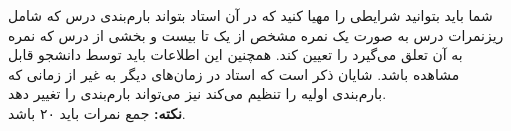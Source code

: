 

شما باید بتوانید شرایطی را مهیا کنید که در آن استاد بتواند بارم‌بندی درس که شامل ریزنمرات درس به صورت یک نمره مشخص از یک تا بیست و بخشی از درس که نمره به آن تعلق می‌گیرد را تعیین کند.
همچنین این اطلاعات باید توسط دانشجو قابل مشاهده باشد.
شایان ذکر است که استاد در زمان‌های دیگر به غیر از زمانی که بارم‌بندی اولیه را تنظیم می‌کند نیز می‌تواند بارم‌بندی را تغییر دهد.\\
\textbf{نکته:} جمع نمرات باید ۲۰ باشد.
